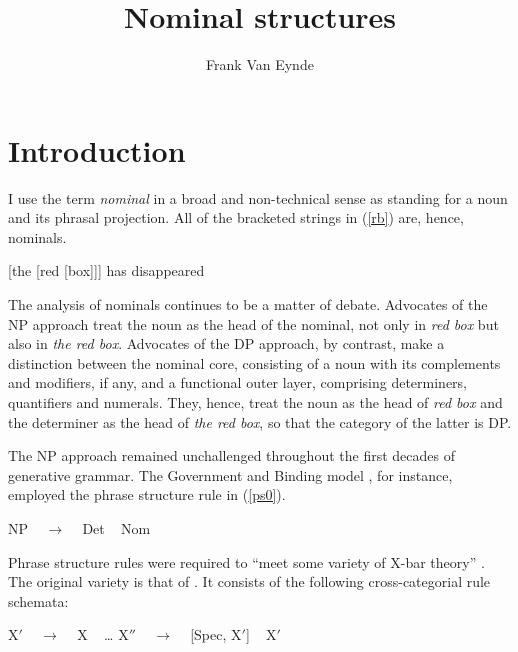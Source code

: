 \documentclass[output=paper
	        ,collection
	        ,collectionchapter
 	        ,biblatex
                ,babelshorthands
                ,newtxmath
                ,draftmode
                ,colorlinks, citecolor=brown
]{langscibook}
\author{Frank {Van Eynde}\affiliation{University of Leuven}}
\title{Nominal structures}
\begin{document}
\maketitle
\label{chap-np}

\section{Introduction}


I use the term \emph{nominal} in a broad and non-technical sense as standing 
for a noun and its phrasal projection. 
All of the bracketed strings in (\ref{rb}) are, hence, nominals. 

\begin{exe} 
\ex\label{rb}  
{}[the [red [box]]] has disappeared
\end{exe} 
  
\noindent
The analysis of nominals continues to be a matter of debate. 
Advocates of the NP approach treat the noun as the head of the nominal, 
not only in \emph{red box} but also in \emph{the red box}. 
Advocates of the DP approach, by contrast, 
make a distinction between the nominal core, 
consisting of a noun with its complements and modifiers, if any,  
and a functional outer layer, comprising determiners, quantifiers and numerals. 
They, hence, treat the noun as the head of \emph{red box} and the determiner as
the head of \emph{the red box}, so that the category of the latter is DP. 

The NP approach remained unchallenged throughout the first decades of generative 
grammar. The Government and Binding model \citep{Chomsky81}, for instance, 
employed the phrase structure rule in (\ref{ps0}). 

\begin{exe} 
\ex\label{ps0}     NP ~ $\rightarrow$ ~ Det ~ Nom
\end{exe}

\noindent
Phrase structure rules were required to ``meet some variety of X-bar theory'' \citep[5]{Chomsky81}. 
The original variety is that of \citet{Chomsky70}. It consists of the following
cross-categorial rule schemata:

\begin{exe} 
\ex\label{xbar} 
\begin{xlist} 
\ex\label{xbar1}   X$'$ ~ $\rightarrow$ ~ X ~  \ldots 
\ex\label{xbar2}   X$''$ ~ $\rightarrow$ ~ [Spec, X$'$] ~ X$'$ 
\end{xlist} 
\end{exe} 
\end{document}
